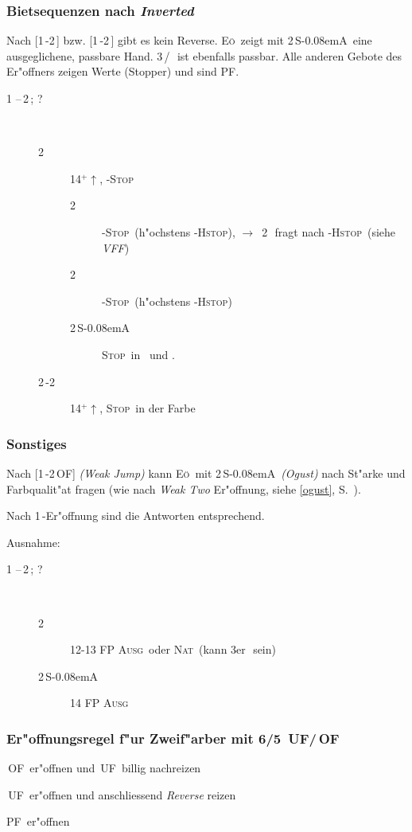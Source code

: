 \documentclass[11pt,german,twocolumn]{scrartcl}
\renewcommand{\Cl}{{\color{ClColor}{$\clubsuit$}}}
\renewcommand{\Di}{{\color{DiColor}{$\vardiamondsuit$}}}
\renewcommand{\He}{{\color{HeColor}{$\varheartsuit$}}}
\renewcommand{\Sp}{{\color{SpColor}{$\spadesuit$}}}
\def\pik{\,\Sp}
\def\coe{\,\He}
\def\kar{\,\Di}
\def\tre{\,\Cl}
\def\pi{\Sp}
\def\co{\He}
\def\ka{\Di}
\def\good{$^+$}
\def\ra{$\rightarrow$}
\def\pl{$\uparrow$}
\def\uf{\textsf{\,UF}}
\def\of{\textsf{\,OF}}
\def\SA{\textsf{\,S\kern-0.08emA}}
\def\sep{\,--\,}
\newcommand{\conv}[1]{\emph{#1}}
\def\bal{\textsc{Ausg}}
\def\nat{\textsc{Nat}}
\def\pf{\textsc{PF}}
\def\stp{\textsc{Stop}}
\def\hstp{\textsc{Hstop}}
\def\cstop{\co-\stp}
\def\pstop{\pi-\stp}
\def\kstop{\ka-\stp}
\def\chstop{\co-\hstp}
\def\phstop{\pi-\hstp}
\def\eo{\textsc{E\"o}}
\def\bdsc{\begin{description}}
\def\edsc{\end{description}}
\begin{document}
\subsubsection{Bietsequenzen nach \conv{Inverted}}

Nach [1\tre-2\tre] bzw. [1\kar-2\kar] gibt es kein Reverse.  \eo\
zeigt mit 2\SA\ eine ausgeglichene, passbare Hand.  3\tre/\kar\ ist
ebenfalls passbar.  Alle anderen Gebote des Er"offners zeigen Werte
(Stopper) und sind \pf.

\bdsc
  \item[1\tre\sep2\tre; ?]~
    \bdsc
      \item[2\kar] 14\good\pl, \kstop
        \bdsc
        \item[2\coe] \cstop\ (h"ochstens \phstop), \ra~2\pik\ fragt
          nach \phstop\ (siehe \conv{VFF})
        \item[2\pik] \pstop\ (h"ochstens \chstop)
        \item[2\SA] \stp\ in \co\ und \pi.
        \edsc
      \item[2\coe-2\pik] 14\good\pl, \stp\ in der Farbe
    \edsc
\edsc

\subsubsection*{Sonstiges}

Nach [1\tre-2\of] \conv{(Weak Jump)} kann \eo\ mit 2\SA\
\conv{(Ogust)} nach St"arke und Farbqualit"at fragen (wie nach
\conv{Weak Two} Er"offnung, siehe \ref{ogust}, S.~\pageref{ogust}).

Nach 1\kar{}-Er"offnung sind die Antworten entsprechend.

Ausnahme:
\bdsc
  \item[1\kar\sep2\tre; ?]~
    \bdsc
    \item[2\kar] 12-13 FP \bal\ oder \nat\ (kann 3er\kar\ sein)
    \item[2\SA] 14 FP \bal
    \edsc
\edsc
        

\subsubsection*{\label{zfregel}Er"offnungsregel f"ur Zweif"arber mit 6/5 \uf/\of}

\bdsc
\setlength{\labelsep}{1ex}
\item[4\pl{} Verlierer:] \of\ er"offnen und \uf\ billig nachreizen
\item[3-4 Verlierer:] \uf\ er"offnen und anschliessend \conv{Reverse}
  reizen
\item[0-2 Verlierer:] \pf\ er"offnen
\edsc
\end{document}
